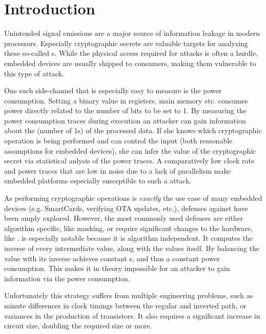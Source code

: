 \section{Introduction}
Unintended signal emissions are a major source of information leakage in modern processors.
Especially cryptographic secrets are valuable targets for analyzing these so-called \sidechannel{}s.
While the physical access required for \sidechannel{} attacks is often a hurdle, embedded devices are usually shipped to consumers, making them vulnerable to this type of attack.

One such side-channel that is especially easy to measure is the power consumption.
Setting a binary value in registers, main memory etc. consumes power directly related to the number of bits to be set to 1.
By measuring the power consumption traces during execution an attacker can gain information about the \hammingw{} (number of 1s) of the processed data.
If she knows which cryptographic operation is being performed and can control the input (both reasonable assumptions for embedded devices), she can infer the value of the cryptographic secret via statistical anlysis of the power traces.
A comparatively low clock rate and power traces that are low in noise due to a lack of parallelism make embedded platforms especially susceptible to such a \poweranalysis{} attack.

As performing cryptographic operations is \emph{exactly} the use case of many embedded devices (e.g. SmartCards, verifying OTA updates, etc.), defenses against \poweranalysis{} have been amply explored.
However, the most commonly used defenses are either algorithm specific, like masking, or require significant changes to the hardware, like \dual{}.
\dual{} is especially notable because it is algorithm independent.
It computes the inverse of every intermediate value, along with the values itself.
By balancing the value with its inverse \dual{} achieves constant \hammingw{}s, and thus a constant power consumption.
This makes it in theory impossible for an attacker to gain information via the power consumption.

Unfortunately this strategy suffers from multiple engineering problems, such as minute differences in clock timings between the regular and inverted path\cite{baddam2008path}, or variances in the production of transistors\cite{razafindraibe2006formal}.
It also requires a significant increase in circuit size, doubling the required size or more\cite{baddam2008path}.

